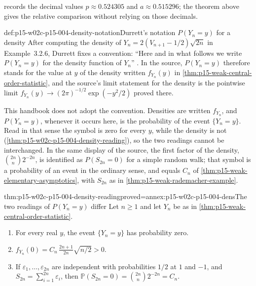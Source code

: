  records the decimal values
\(p\approx0.524305\) and \(a\approx0.515296\); the theorem above gives
the relative comparison without relying on those decimals.

\begin{hbconvention}{def:p15-w02c-p15-004-density-notation}{Durrett's notation \(P(Y_n=y)\) for a density}
After computing the density of \(Y_n=2(V_{n+1}-1/2)\sqrt{2n}\) in
Example~3.2.6, Durrett fixes a convention:
``Here and in what follows we write \(P(Y_n=y)\) for the density
function of \(Y_n\)'' \cite[p.~118]{DurrettPTEAuthor2019}. In the
source, \(P(Y_n=y)\) therefore stands for the value at \(y\) of the
density written \(f_{Y_n}(y)\) in
\cref{thm:p15-weak-central-order-statistic}, and the source's limit
statement for the density is the pointwise limit
\(f_{Y_n}(y)\to(2\pi)^{-1/2}\exp(-y^2/2)\) proved there.

This handbook does not adopt the convention. Densities are written
\(f_{Y_n}\), and \(P(Y_n=y)\), whenever it occurs here, is the
probability of the event \(\{Y_n=y\}\). Read in that sense the symbol is
zero for every \(y\), while the density is not
(\cref{thm:p15-w02c-p15-004-density-reading}), so the two readings
cannot be interchanged. In the same display of the source, the first
factor of the density, \(\binom{2n}{n}2^{-2n}\), is identified as
\(P(S_{2n}=0)\) for a simple random walk; that symbol is a probability
of an event in the ordinary sense, and equals \(C_n\) of
\cref{thm:p15-weak-elementary-asymptotics}, with \(S_{2n}\) as in
\cref{thm:p15-weak-rademacher-example}.
\end{hbconvention}

\begin{hblemma}{thm:p15-w02c-p15-004-density-reading}{proved=annex:p15-w02c-p15-004-dens}{The two readings of \(P(Y_n=y)\) differ}
Let \(n\geq1\) and let \(Y_n\) be as in
\cref{thm:p15-weak-central-order-statistic}.
\begin{enumerate}
\item For every real \(y\), the event \(\{Y_n=y\}\) has probability
zero.
\item \(f_{Y_n}(0)=C_n\,\frac{2n+1}{2n}\sqrt{n/2}>0\).
\item If \(\varepsilon_1,\ldots,\varepsilon_{2n}\) are independent with
probabilities \(1/2\) at \(1\) and \(-1\), and
\(S_{2n}=\sum_{i=1}^{2n}\varepsilon_i\), then
\(\mathbb P(S_{2n}=0)=\binom{2n}{n}2^{-2n}=C_n\).
\end{enumerate}
\end{hblemma}

